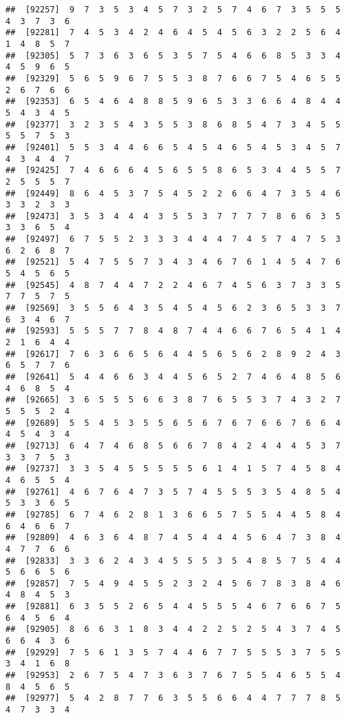 \documentclass[
]{book}
\begin{document}
\begin{verbatim}
##  [92257]  9  7  3  5  3  4  5  7  3  2  5  7  4  6  7  3  5  5  5  4  3  7  3  6
##  [92281]  7  4  5  3  4  2  4  6  4  5  4  5  6  3  2  2  5  6  4  1  4  8  5  7
##  [92305]  5  7  3  6  3  6  5  3  5  7  5  4  6  6  8  5  3  3  4  4  5  9  6  5
##  [92329]  5  6  5  9  6  7  5  5  3  8  7  6  6  7  5  4  6  5  5  2  6  7  6  6
##  [92353]  6  5  4  6  4  8  8  5  9  6  5  3  3  6  6  4  8  4  4  5  4  3  4  5
##  [92377]  3  2  3  5  4  3  5  5  3  8  6  8  5  4  7  3  4  5  5  5  5  7  5  3
##  [92401]  5  5  3  4  4  6  6  5  4  5  4  6  5  4  5  3  4  5  7  4  3  4  4  7
##  [92425]  7  4  6  6  6  4  5  6  5  5  8  6  5  3  4  4  5  5  7  2  5  5  5  7
##  [92449]  8  6  4  5  3  7  5  4  5  2  2  6  6  4  7  3  5  4  6  3  3  2  3  3
##  [92473]  3  5  3  4  4  4  3  5  5  3  7  7  7  7  8  6  6  3  5  3  3  6  5  4
##  [92497]  6  7  5  5  2  3  3  3  4  4  4  7  4  5  7  4  7  5  3  6  2  6  8  7
##  [92521]  5  4  7  5  5  7  3  4  3  4  6  7  6  1  4  5  4  7  6  5  4  5  6  5
##  [92545]  4  8  7  4  4  7  2  2  4  6  7  4  5  6  3  7  3  3  5  7  7  5  7  5
##  [92569]  3  5  5  6  4  3  5  4  5  4  5  6  2  3  6  5  3  3  7  6  3  4  6  7
##  [92593]  5  5  5  7  7  8  4  8  7  4  4  6  6  7  6  5  4  1  4  2  1  6  4  4
##  [92617]  7  6  3  6  6  5  6  4  4  5  6  5  6  2  8  9  2  4  3  6  5  7  7  6
##  [92641]  5  4  4  6  6  3  4  4  5  6  5  2  7  4  6  4  8  5  6  4  6  8  5  4
##  [92665]  3  6  5  5  5  6  6  3  8  7  6  5  5  3  7  4  3  2  7  5  5  5  2  4
##  [92689]  5  5  4  5  3  5  5  6  5  6  7  6  7  6  6  7  6  6  4  4  5  4  3  4
##  [92713]  6  4  7  4  6  8  5  6  6  7  8  4  2  4  4  4  5  3  7  3  3  7  5  3
##  [92737]  3  3  5  4  5  5  5  5  5  6  1  4  1  5  7  4  5  8  4  4  6  5  5  4
##  [92761]  4  6  7  6  4  7  3  5  7  4  5  5  5  3  5  4  8  5  4  5  3  3  6  5
##  [92785]  6  7  4  6  2  8  1  3  6  6  5  7  5  5  4  4  5  8  4  6  4  6  6  7
##  [92809]  4  6  3  6  4  8  7  4  5  4  4  4  5  6  4  7  3  8  4  4  7  7  6  6
##  [92833]  3  3  6  2  4  3  4  5  5  5  3  5  4  8  5  7  5  4  4  5  6  6  5  6
##  [92857]  7  5  4  9  4  5  5  2  3  2  4  5  6  7  8  3  8  4  6  4  8  4  5  3
##  [92881]  6  3  5  5  2  6  5  4  4  5  5  5  4  6  7  6  6  7  5  6  4  5  6  4
##  [92905]  8  6  6  3  1  8  3  4  4  2  2  5  2  5  4  3  7  4  5  6  6  4  3  6
##  [92929]  7  5  6  1  3  5  7  4  4  6  7  7  5  5  5  3  7  5  5  3  4  1  6  8
##  [92953]  2  6  7  5  4  7  3  6  3  7  6  7  5  5  4  6  5  5  4  8  4  5  6  5
##  [92977]  5  4  2  8  7  7  6  3  5  5  6  6  4  4  7  7  7  8  5  4  7  3  3  4

\end{verbatim}
\end{document}
